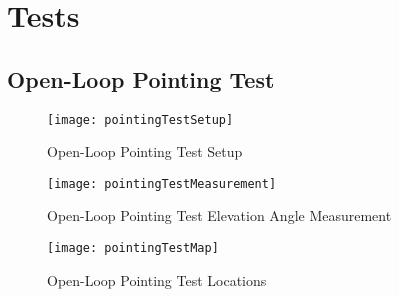 \chapter{Tests}

\section{Open-Loop Pointing Test}
\begin{figure}[!htb]
  \centering
  \texttt{[image: pointingTestSetup]}
  \caption{Open-Loop Pointing Test Setup}
  \label{fig:pointingTestSetup}
\end{figure}
\begin{figure}[!htb]
  \centering
  \texttt{[image: pointingTestMeasurement]}
  \caption{Open-Loop Pointing Test Elevation Angle Measurement}
  \label{fig:pointingTestMeasurement}
\end{figure}
\begin{figure}[!htb]
  \centering
  \texttt{[image: pointingTestMap]}
  \caption{Open-Loop Pointing Test Locations}
  \label{fig:pointingTestMap}
\end{figure}

\clearpage
